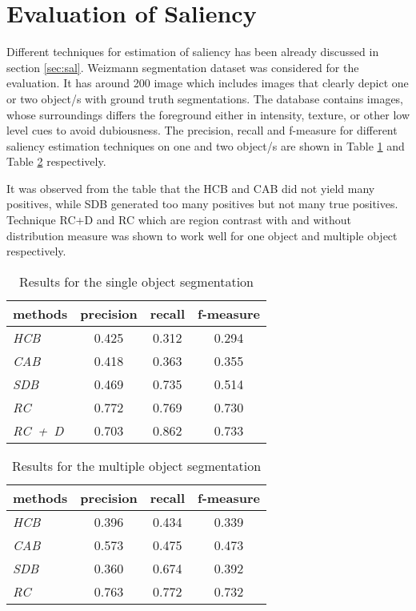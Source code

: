 \section{Evaluation of Saliency}
\label{sec:EvS}
Different techniques for estimation of saliency has been already discussed in section \ref{sec:sal}.  Weizmann segmentation dataset was considered for the evaluation.  It has around 200 image which includes images that clearly depict one or two object/s with ground truth segmentations. The database contains images, whose surroundings differs the foreground  either in intensity, texture, or other low level cues to avoid dubiousness.  The precision, recall and f-measure for different saliency estimation techniques on one and two object/s are shown in Table \ref{tab:salOneObj} and Table \ref{tab:salTwoObj} respectively. 
\par It was observed from the table that the HCB and CAB did not yield many positives, while SDB generated too many positives but not many true positives. Technique RC+D and RC which are region contrast with and without distribution measure was shown to work well for one object and multiple object respectively.
\begin{table}[htbp]
   \caption{Results for the single object segmentation}
   \begin{center}
   \begin{tabular}{|l|c|c|c|} \hline
     \textbf{methods} & \textbf{precision} & \textbf{recall} & \textbf{f-measure} \\ \hline
     \emph{HCB} & 0.425 & 0.312 & 0.294 \\
	 \emph{CAB} & 0.418 & 0.363 & 0.355 \\
 	 \emph{SDB} & 0.469 & 0.735 & 0.514 \\
	 \emph{RC}  & 0.772 & 0.769 & 0.730 \\
	 \emph{RC~+~D} & 0.703	& 0.862 & 0.733	\\ \hline
   \end{tabular}
   \label{tab:salOneObj}
   \medskip \small 
   \end{center}
 \end{table}
\begin{table}[htbp]
   \caption{Results for the multiple object segmentation}
   \begin{center}
   \begin{tabular}{|l|c|c|c|} \hline
     \textbf{methods} & \textbf{precision} & \textbf{recall} & \textbf{f-measure} \\ \hline
     \emph{HCB} & 0.396 & 0.434 & 0.339 \\
	 \emph{CAB} & 0.573 & 0.475 & 0.473 \\
 	 \emph{SDB} & 0.360 & 0.674 & 0.392 \\
	 \emph{RC}  & 0.763 & 0.772 & 0.732 \\ \hline
   \end{tabular}
   \label{tab:salTwoObj}
   \end{center}
 \end{table} 
